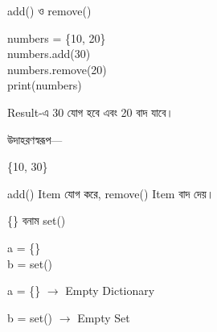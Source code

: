 \begin{codeoutputbox}{\textenglish{\ttfamily add()} ও \textenglish{\ttfamily remove()}}

\noindent
\begin{minipage}[t]{0.53\linewidth}
\codeheading

\begin{english}
\ttfamily
numbers = \{10, 20\}\\
numbers.add(30)\\
numbers.remove(20)\\
print(numbers)
\end{english}

\end{minipage}
\hfill
\begin{minipage}[t]{0.43\linewidth}
\outputheading

Result-এ 30 যোগ হবে এবং 20 বাদ যাবে।

উদাহরণস্বরূপ—

\begin{center}
\textenglish{\ttfamily \{10, 30\}}
\end{center}

\textenglish{\ttfamily add()}
Item যোগ করে,
\textenglish{\ttfamily remove()}
Item বাদ দেয়।

\end{minipage}

\end{codeoutputbox}



\begin{codeoutputbox}{\textenglish{\ttfamily \{\}} বনাম \textenglish{\ttfamily set()}}

\noindent
\begin{minipage}[t]{0.48\linewidth}
\codeheading

\begin{english}
\ttfamily
a = \{\}\\
b = set()
\end{english}

\end{minipage}
\hfill
\begin{minipage}[t]{0.48\linewidth}
\outputheading

\textenglish{\ttfamily a = \{\}}
\(\longrightarrow\)
Empty Dictionary

\medskip

\textenglish{\ttfamily b = set()}
\(\longrightarrow\)
Empty Set

\end{minipage}

\end{codeoutputbox}

